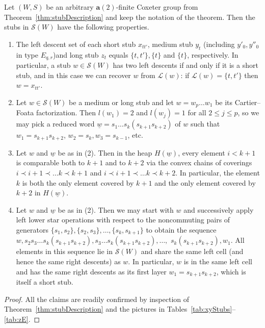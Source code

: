 \documentclass[ALCO,Unicode,published]{cedram}
\newcommand{\call}{\mathcal{L}}
\newcommand{\la}{\mathbf{a}}
\newcommand{\sw}{\mathcal{S}(W)}
\newcommand{\ul}{\underline}
\newcommand{\tul}{\textup{(}}
\newcommand{\tur}{\textup{)}}
\begin{document}
\begin{lemma}
    \label{lemm:stubRemarks}
    Let $(W,S)$ be an arbitrary $\la(2)$-finite Coxeter group from Theorem~\ref{thm:stubDescription} and keep the notation
    of the theorem.  Then the stubs in $\sw$ have the following properties.  
    \begin{enumerate}
        \item The left descent set of each short stub  $x_{tt'}$, medium stub $y_t$ \tul including
             $y'_0,y''_0$ in type $E_{q,r}$\tur and long stub $z_t$ equals $\{t,t'\}, \{t\}$ and
             $\{t\}$, respectively. In particular, a stub $w\in \sw$ has two left descents if and
             only if it is a short stub, and in this case we can recover $w$ from $\call(w)$: if
             $\call(w)=\{t,t'\}$ then $w=x_{tt'}$.
        \item Let $w\in \sw$ be a medium or long stub and let $w=w_p\dots w_1$ be its Cartier--Foata
             factorization.  Then $l(w_1)=2$ and  $l(w_j)=1$ for all $2\le j\le p$, so we may pick a
             reduced word $ \ul{w}= s_1\dots s_{k}(s_{k+1}s_{k+2}) $ of $w$ such that
             $w_1=s_{k+1}s_{k+2}$, $w_2=s_{k}, w_3=s_{k-1}$, etc.
        \item Let $w$ and $\ul w$ be as in \textup{(2)}. Then in the heap $H(\ul w)$, every element
             $i<k+1$ is comparable both to $k+1$ and to $k+2$ via the convex chains of coverings
             $i\prec i+1\prec \dots k\prec k+1$ and $i\prec i+1\prec \dots k\prec k+2$. In
             particular, the element $k$ is both the only element covered by $k+1$ and the only
             element covered by $k+2$ in $H(\ul w)$. 
        \item Let $w$ and $\ul w$ be as in \textup{(2)}. Then we may start with $w$ and successively
             apply left lower star operations with respect to the noncommuting pairs of generators
             $\{s_1,s_2\}, \{s_2,s_3\},\dots, \{s_{k},s_{k+1}\}$ to obtain the sequence $w,
             s_2s_3\dots s_k(s_{k+1}s_{k+2}), s_3\dots s_{k}(s_{k+1}s_{k+2}), \dots,$
             $s_k(s_{k+1}s_{k+2}), w_1$. All elements in this sequence lie in $\sw$ and share the
             same left cell (and hence the same right descents) as $w$. In particular, $w$ is
             in the same left cell and has the same right descents as its first layer $w_1 =
             s_{k+1}s_{k+2}$, which is itself a short stub.
            \end{enumerate}
    \end{lemma}
    \begin{proof} All the claims are readily confirmed by inspection of Theorem~\ref{thm:stubDescription}
          and the pictures in Tables~\ref{tab:xyStubs}--\ref{tab:zE}.     
    \end{proof}
\end{document}
